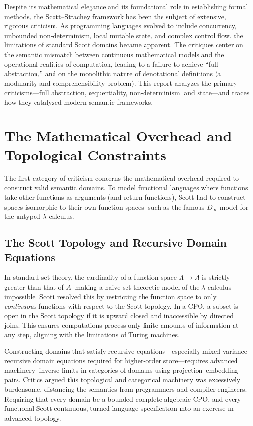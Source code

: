 \documentclass[11pt]{article}
\begin{document}
Despite its mathematical elegance and its foundational role in establishing formal
methods, the Scott--Strachey framework has been the subject of extensive, rigorous
criticism. As programming languages evolved to include concurrency, unbounded
non-determinism, local mutable state, and complex control flow, the limitations of
standard Scott domains became apparent. The critiques center on the semantic
mismatch between continuous mathematical models and the operational realities of
computation, leading to a failure to achieve ``full abstraction,'' and on the
monolithic nature of denotational definitions (a modularity and comprehensibility
problem). This report analyzes the primary criticisms---full abstraction,
sequentiality, non-determinism, and state---and traces how they catalyzed modern
semantic frameworks.

\section{The Mathematical Overhead and Topological Constraints}

The first category of criticism concerns the mathematical overhead required to
construct valid semantic domains. To model functional languages where functions take
other functions as arguments (and return functions), Scott had to construct spaces
isomorphic to their own function spaces, such as the famous $D_\infty$ model for the
untyped $\lambda$-calculus.

\subsection{The Scott Topology and Recursive Domain Equations}

In standard set theory, the cardinality of a function space $A \to A$ is strictly
greater than that of $A$, making a naive set-theoretic model of the $\lambda$-calculus
impossible. Scott resolved this by restricting the function space to only
\emph{continuous} functions with respect to the Scott topology. In a CPO, a subset is
open in the Scott topology if it is upward closed and inaccessible by directed joins.
This ensures computations process only finite amounts of information at any step,
aligning with the limitations of Turing machines.

Constructing domains that satisfy recursive equations---especially mixed-variance
recursive domain equations required for higher-order store---requires advanced
machinery: inverse limits in categories of domains using projection--embedding pairs.
Critics argued this topological and categorical machinery was excessively burdensome,
distancing the semantics from programmers and compiler engineers. Requiring that every
domain be a bounded-complete algebraic CPO, and every functional Scott-continuous,
turned language specification into an exercise in advanced topology.
\end{document}
